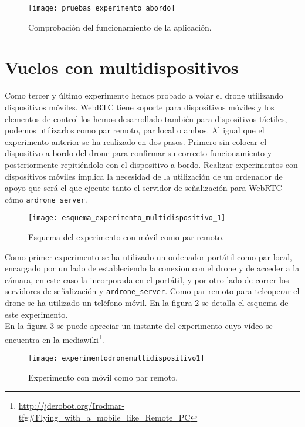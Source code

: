 \begin{figure}[h!]
\centering
\texttt{[image: pruebas\_experimento\_abordo]}
\caption{Comprobación del funcionamiento de la aplicación.}
\label{fig:pruebaexperimentoabordo}
\end{figure}

\section{Vuelos con multidispositivos}

Como tercer y último experimento hemos probado a volar el drone utilizando dispositivos móviles. WebRTC tiene soporte para dispositivos móviles y los elementos de control los hemos desarrollado también para dispositivos táctiles, podemos utilizarlos como par remoto, par local o ambos. Al igual que el experimento anterior se ha realizado en dos pasos. Primero sin colocar el dispositivo a bordo del drone para confirmar su correcto funcionamiento y posteriormente repitiéndolo con el dispositivo a bordo. Realizar experimentos con dispositivos móviles implica la necesidad de la utilización de un ordenador de apoyo que será el que ejecute tanto el servidor de señalización para WebRTC cómo \texttt{ardrone\_server}.\\


\begin{figure}[h!]
\centering
\texttt{[image: esquema\_experimento\_multidispositivo\_1]}
\caption{Esquema del experimento con móvil como par remoto.}
\label{fig:esquemaexperimentomultidispositivo}
\end{figure}


Como primer experimento se ha utilizado un ordenador portátil como par local, encargado por un lado de estableciendo la conexion con el drone y de acceder a la cámara, en este caso la incorporada en el portátil, y por otro lado de correr los servidores de señalización y \texttt{ardrone\_server}. Como par remoto para teleoperar el drone se ha utilizado un teléfono móvil. En la figura \ref{fig:esquemaexperimentomultidispositivo} se detalla el esquema de este experimento.\\


En la figura \ref{fig:experimentodronemultidispositivo1} se puede apreciar un instante del experimento cuyo vídeo se encuentra en la mediawiki\footnote{\url{http://jderobot.org/Irodmar-tfg\#Flying\_with\_a\_mobile\_like\_Remote\_PC}}.\\

\begin{figure}[h!]
\centering
\texttt{[image: experimentodronemultidispositivo1]}
\caption{Experimento con móvil como par remoto.}
\label{fig:experimentodronemultidispositivo1}
\end{figure}

